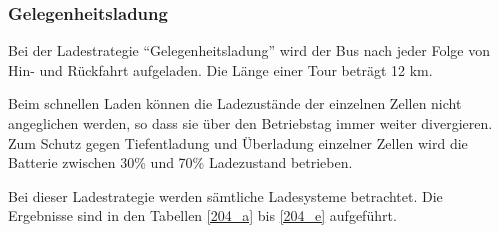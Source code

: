 \subsubsection{Gelegenheitsladung}
\label{erkl204gel}
Bei der Ladestrategie "`Gelegenheitsladung"' wird der Bus nach jeder Folge von Hin- und Rückfahrt aufgeladen. Die Länge einer Tour beträgt 12 km. 

Beim schnellen Laden können die Ladezustände der einzelnen Zellen nicht angeglichen werden, so dass sie über den Betriebstag immer weiter divergieren. Zum Schutz gegen Tiefentladung und Überladung einzelner Zellen wird die Batterie zwischen 30\% und 70\% Ladezustand betrieben.

Bei dieser Ladestrategie werden sämtliche Ladesysteme betrachtet. Die Ergebnisse sind in den Tabellen \ref{204_a} bis \ref{204_e} aufgeführt.


